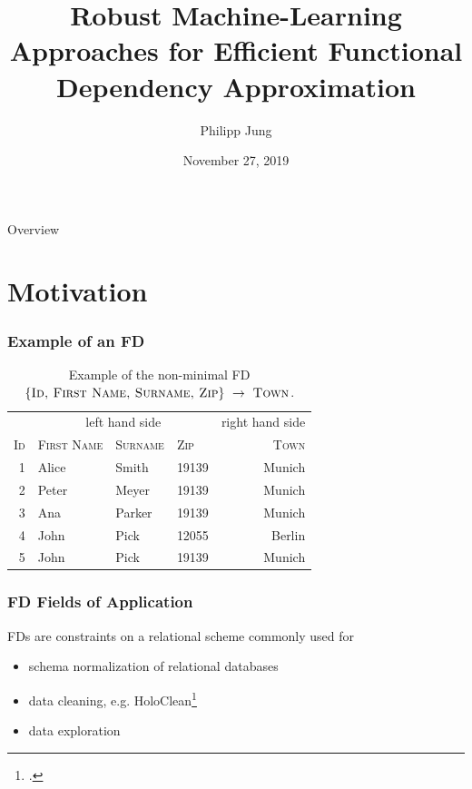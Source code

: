 \documentclass{beamer}
\title{Robust Machine-Learning Approaches for Efficient Functional Dependency Approximation}
\author{Philipp Jung}
\institute[Beuth University of Applied Sciences]
{Beuth University of Applied Sciences\\
\medskip\
philippjung@posteo.de
}
\date{November 27, 2019}
\begin{document}
\maketitle


\begin{frame}{Overview}
    \tableofcontents
\end{frame}


\section{Motivation}

\begin{frame}
    \frametitle{Example of an FD}
\begin{table}[ht]
    \centering
    \begin{tabular}{rlllr}
        \toprule
        \toprule
        & \multicolumn{3}{c}{left hand side} & \multicolumn{1}{c}{right hand side} \\ \cmidrule(lr{.25em}){1-4} \cmidrule(l{4.75em}){4-5}
        \textsc{Id} & \textsc{First Name} & \textsc{Surname} & \textsc{Zip} & \textsc{Town} \\
        \midrule
        1 & Alice & Smith & 19139 & Munich \\
        2 & Peter& Meyer & 19139 & Munich \\
        3 & Ana & Parker & 19139 & Munich  \\
        4 & John & Pick & 12055 & Berlin \\
        5 & John & Pick & 19139 & Munich \\
        \bottomrule
        \bottomrule
    \end{tabular}
    \caption{Example of the non-minimal FD $\textsc{\{Id, First Name, Surname, Zip\}}~\rightarrow~\textsc{Town}$.}
\end{table}
\end{frame}

\begin{frame}
    \frametitle{FD Fields of Application}
    FDs are constraints on a relational scheme commonly used for
    \begin{itemize}
        \item schema normalization of relational databases
        \item data cleaning, e.g. HoloClean\footcite{HEI19}
        \item data exploration
    \end{itemize}
\end{frame}
\end{document}
